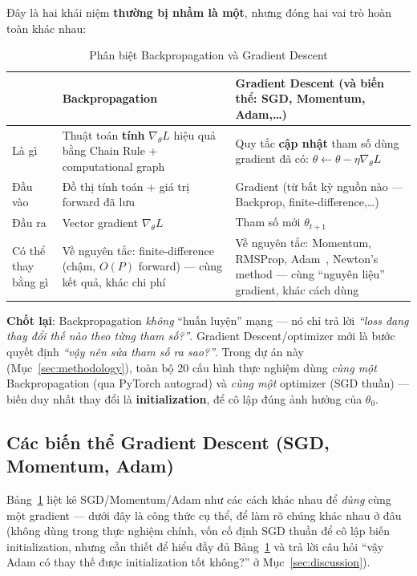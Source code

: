 \documentclass[12pt,a4paper]{report}
\begin{document}
Đây là hai khái niệm \textbf{thường bị nhầm là một}, nhưng đóng hai vai trò
hoàn toàn khác nhau:

\begin{table}[htbp]
\centering
\caption{Phân biệt Backpropagation và Gradient Descent}
\begin{tabular}{@{}p{2.6cm}p{5.7cm}p{6.3cm}@{}}
\toprule
 & \textbf{Backpropagation} & \textbf{Gradient Descent (và biến thể: SGD, Momentum, Adam,\ldots)} \\
\midrule
Là gì & Thuật toán \textbf{tính} $\nabla_\theta L$ hiệu quả bằng Chain Rule + computational graph & Quy tắc \textbf{cập nhật} tham số dùng gradient đã có: $\theta\leftarrow\theta-\eta\nabla_\theta L$ \\
Đầu vào & Đồ thị tính toán + giá trị forward đã lưu & Gradient (từ bất kỳ nguồn nào --- Backprop, finite-difference,\ldots) \\
Đầu ra & Vector gradient $\nabla_\theta L$ & Tham số mới $\theta_{t+1}$ \\
Có thể thay bằng gì & Về nguyên tắc: finite-difference (chậm, $O(P)$ forward) --- cùng kết quả, khác chi phí & Về nguyên tắc: Momentum, RMSProp, Adam~\citep{kingma2015adam}, Newton's method --- cùng ``nguyên liệu'' gradient, khác cách dùng \\
\bottomrule
\end{tabular}
\label{tab:bp_vs_gd}
\end{table}

\textbf{Chốt lại}: Backpropagation \emph{không} ``huấn luyện'' mạng --- nó
chỉ trả lời \emph{``loss đang thay đổi thế nào theo từng tham số?''}.
Gradient Descent/optimizer mới là bước quyết định \emph{``vậy nên sửa tham
số ra sao?''}. Trong dự án này (Mục~\ref{sec:methodology}), toàn bộ 20 cấu
hình thực nghiệm dùng \emph{cùng một} Backpropagation (qua PyTorch autograd)
và \emph{cùng một} optimizer (SGD thuần) --- biến duy nhất thay đổi là
\textbf{initialization}, để cô lập đúng ảnh hưởng của $\theta_0$.

\subsection{Các biến thể Gradient Descent (SGD, Momentum, Adam)}
\label{sec:optimizers}

Bảng~\ref{tab:bp_vs_gd} liệt kê SGD/Momentum/Adam như các cách khác nhau
để \emph{dùng} cùng một gradient --- dưới đây là công thức cụ thể, để làm
rõ chúng khác nhau ở đâu (không dùng trong thực nghiệm chính, vốn cố định
SGD thuần để cô lập biến initialization, nhưng cần thiết để hiểu đầy đủ
Bảng~\ref{tab:bp_vs_gd} và trả lời câu hỏi ``vậy Adam có thay thế được
initialization tốt không?'' ở Mục~\ref{sec:discussion}).
\end{document}
